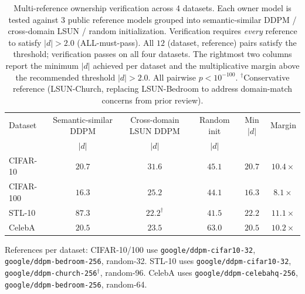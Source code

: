 \documentclass{article}
\begin{document}
\begin{table}[t]
\caption{Multi-reference ownership verification across 4 datasets.
Each owner model is tested against 3 public reference models grouped into
semantic-similar DDPM / cross-domain LSUN / random initialization.
Verification requires \emph{every} reference to satisfy $|d|>2.0$
(ALL-must-pass).
All $12$ (dataset, reference) pairs satisfy the threshold;
verification passes on all four datasets.
The rightmost two columns report the minimum $|d|$ achieved per dataset
and the multiplicative margin above the recommended threshold $|d|>2.0$.
All pairwise $p < 10^{-100}$.
$^\dagger$Conservative reference (LSUN-Church, replacing LSUN-Bedroom
to address domain-match concerns from prior review).}
\label{tab:main_results}
\centering
\begin{small}
\setlength{\tabcolsep}{4pt}
\begin{tabular}{@{}lccccc@{}}
\toprule
Dataset & Semantic-similar DDPM & Cross-domain LSUN DDPM & Random init & Min $|d|$ & Margin \\
        & $|d|$ & $|d|$ & $|d|$ & & \\
\midrule
CIFAR-10  & $20.7$ & $31.6$         & $45.1$ & $20.7$ & $10.4\times$ \\
CIFAR-100 & $16.3$ & $25.2$         & $44.1$ & $16.3$ & $8.1\times$ \\
STL-10    & $87.3$ & $22.2^\dagger$ & $41.5$ & $22.2$ & $11.1\times$ \\
CelebA    & $20.5$ & $23.5$         & $63.0$ & $20.5$ & $10.2\times$ \\
\bottomrule
\end{tabular}

\vspace{2pt}
\begin{minipage}{\linewidth}
\footnotesize
References per dataset: CIFAR-10/100 use
\texttt{google/ddpm-cifar10-32}, \texttt{google/ddpm-bedroom-256}, random-32.
STL-10 uses \texttt{google/ddpm-cifar10-32},
\texttt{google/ddpm-church-256}$^\dagger$, random-96.
CelebA uses \texttt{google/ddpm-celebahq-256},
\texttt{google/ddpm-bedroom-256}, random-64.
\end{minipage}
\end{small}
\end{table}
\end{document}
